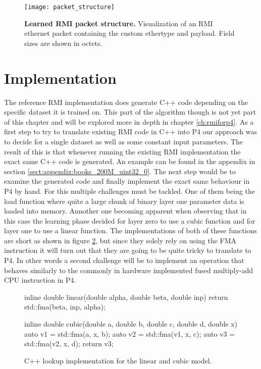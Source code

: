 \begin{figure}[ht]
  \centering
  \texttt{[image: packet\_structure]}
  \caption[RMI packet structure]{
    \textbf{Learned RMI packet structure.} Visualization of an RMI ethernet packet containing the custom ethertype and payload. Field sizes are shown in octets.
  }
  \label{fig:packet_structure}
\end{figure}

\section{Implementation}
\label{sect:rmionbmv2:implmentation}
The reference RMI implementation does generate C++ code depending on the specific dataset it is trained on. This part of the algorithm though is not yet part of this chapter and will be explored more in depth in chapter \ref{ch:rmiforp4}. As a first step to try to translate existing RMI code in C++ into P4 our approach was to decide for a single dataset as well as some constant input parameters. The result of this is that whenever running the existing RMI implementation the exact same C++ code is generated. An example can be found in the appendix in section \ref{sect:appendix:books_200M_uint32_0}. The next step would be to examine the generated code and finally implement the exact same behaviour in P4 by hand. For this multiple challenges must be tackled. One of them being the load function where quite a large chunk of binary layer one parameter data is loaded into memory. Annother one becoming apparent when observing that in this case the learning phase decided for layer zero to use a cubic function and for layer one to use a linear function. The implementations of both of these functions are short as shown in figure \ref{fig:linear_cubic}, but since they solely rely on using the FMA instruction it will turn out that they are going to be quite tricky to translate to P4. In other words a second challenge will be to implement an operation that behaves similarly to the commonly in hardware implemented fused multiply-add CPU instruction in P4.

\captionsetup[figure]{skip=-10pt} %
\begin{figure}[ht]
  \begin{C++}
inline double linear(double alpha, double beta, double inp) {
  return std::fma(beta, inp, alpha);
}

inline double cubic(double a, double b, double c, double d, double x) {
  auto v1 = std::fma(a, x, b);
  auto v2 = std::fma(v1, x, c);
  auto v3 = std::fma(v2, x, d);
  return v3;
}\end{C++}
  \caption[Linear and cubic lookup implementation in C++]{ C++ lookup implementation for the linear and cubic model. }
  \label{fig:linear_cubic}
\end{figure}

